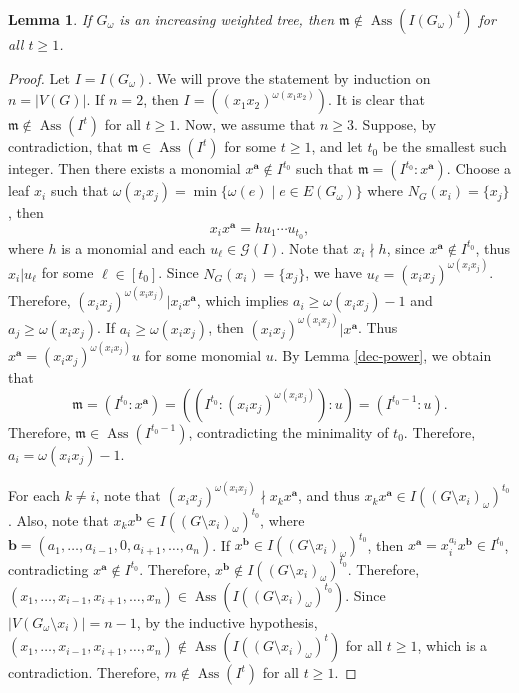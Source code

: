 \documentclass[12pt,amscd]{amsart}
\DeclareMathOperator{\ass}{Ass}
\newtheorem{lem}[thm]{Lemma}
\theoremstyle{definition}
\def\m {\mathfrak m}
\def\ab {\mathbf a}
\def\bb {\mathbf b}
\begin{document}
 \begin{lem}\label{maxIdeal} If $G_\omega$ is an increasing weighted tree, then $\m \notin \ass (I(G_\omega)^t)$ for all $t\geqslant 1$.
\end{lem}
 \begin{proof}
	   	  Let $I=I(G_\omega )$. We will prove the statement by induction on $n=|V(G)|$. If $n=2$, then $I=((x_1x_2)^{\omega (x_1x_2)})$. It is clear that $\m\notin \operatorname{Ass}(I^t)$ for all $t\ge 1$. Now, we assume that $n\ge 3$. Suppose, by contradiction, that $\m\in \operatorname{Ass}(I^t)$ for some $t\ge 1$, and let $t_0$ be the smallest such integer.  Then 
there exists a monomial $x^{\mathbf{a}}\notin I^{t_0}$ such that $\m=(I^{t_0}:x^{\ab})$. Choose a leaf $x_i$  such that $\omega (x_ix_j)=\min\{\omega (e)\mid e\in E(G_\omega )\}$ where $N_{G}(x_i)=\{x_j\}$, then 
	   	\[
  x_ix^{\ab}=hu_1\cdots u_{t_0},
	   	  \]
	   	  where $h$ is a monomial and each $u_{\ell}\in \mathcal{G}(I)$. Note that $x_i\nmid h$, since $x^{\ab}\notin I^{t_0}$, thus $x_i|u_{\ell}$ for some $\ell\in[t_0]$. Since $N_{G}(x_i)=\{x_j\}$, we have $u_{\ell}=(x_ix_j)^{\omega (x_ix_j)}$. Therefore,  $(x_ix_j)^{\omega (x_ix_j)}|x_ix^{\mathbf{a}}$,  which implies $a_i\ge \omega (x_ix_j)-1$ and $a_j\ge \omega (x_ix_j)$. If  $a_i\ge \omega (x_ix_j)$, then $(x_ix_j)^{\omega (x_ix_j)}|x^{\ab}$. Thus  $x^{\ab}=(x_ix_j)^{\omega (x_ix_j)}u$ for some monomial $u$. By Lemma \ref{dec-power}, we obtain that 
	   	  \[
	   	  \m=(I^{t_0}:x^{\ab})=((I^{t_0}:(x_ix_j)^{\omega (x_ix_j)}):u)=(I^{t_0-1}:u).
	   	  \]
	Therefore, $\m \in \operatorname{Ass}(I^{t_0-1})$,  contradicting the minimality of $t_0$. Therefore, $a_i=\omega (x_ix_j)-1$. 

 For each $k\neq i$,  note that $(x_ix_j)^{\omega (x_ix_j)}\nmid x_kx^{\ab}$, and thus
 $x_kx^{\ab}\in I((G \setminus x_i)_{\omega})^{t_0}$.
Also, note that $x_kx^{\bb}\in I((G \setminus x_i)_{\omega})^{t_0}$, where $\bb=(a_1,\ldots,a_{i-1},0,a_{i+1},\ldots,a_n)$. If $x^{\bb}\in I((G \setminus x_i)_{\omega})^{t_0}$, then $x^{\ab}=x_i^{a_i}x^{\bb}\in I^{t_0}$,
contradicting $x^{\ab}\notin I^{t_0}$. Therefore, $x^{\bb}\notin I((G \setminus x_i)_{\omega})^{t_0}$. Therefore, $(x_1,\ldots,x_{i-1},x_{i+1},\ldots,x_n)\in \operatorname{Ass}(I((G \setminus x_i)_{\omega})^{t_0})$.
Since $|V(G_\omega \setminus x_i)| = n-1$, by the inductive hypothesis,   $(x_1,\ldots,x_{i-1},x_{i+1},\ldots,x_n)\notin \operatorname{Ass}(I((G \setminus x_i)_{\omega})^t)$ for all $t\ge 1$, which is a contradiction.
Therefore,  $m\notin \operatorname{Ass}(I^t)$ for all $t\ge 1$.
 \end{proof}
\end{document}

